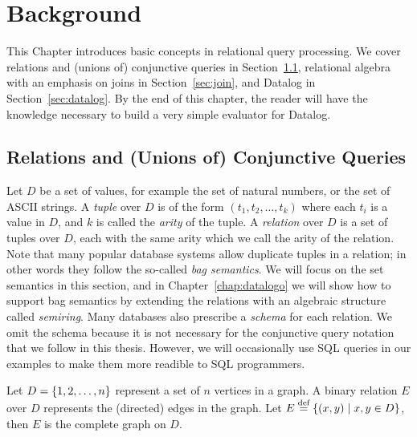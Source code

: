 \chapter{Background}
\label{chap:background}

This Chapter introduces basic concepts in relational query processing. 
We cover relations and (unions of) conjunctive queries in Section~\ref{sec:relations-and-conjunctive-queries},
 relational algebra with an emphasis on joins in Section~\ref{sec:join},
 and Datalog in Section~\ref{sec:datalog}.
By the end of this chapter, 
 the reader will have the knowledge necessary
 to build a very simple evaluator for Datalog.

\section{Relations and (Unions of) Conjunctive Queries}
\label{sec:relations-and-conjunctive-queries}

Let $D$ be a set of values, for example the set of natural numbers,
 or the set of ASCII strings.
A {\em tuple} over $D$ is of the form $(t_1, t_2, \ldots, t_k)$
 where each $t_i$ is a value in $D$,
 and $k$ is called the {\em arity} of the tuple.
A {\em relation} over $D$ is a set of tuples over $D$,
 each with the same arity which we call the arity of the relation.
Note that many popular database systems allow duplicate tuples in a relation;
 in other words they follow the so-called {\em bag semantics}.
We will focus on the set semantics in this section,
 and in Chapter~\ref{chap:datalogo} we will show how to
 support bag semantics by extending the relations
 with an algebraic structure called {\em semiring}.
Many databases also prescribe a {\em schema} for each relation.
We omit the schema because it is not necessary for the 
 conjunctive query notation that we follow in this thesis.
However, we will occasionally use SQL queries in our examples 
 to make them more readible to SQL programmers.

\begin{ex}
\label{ex:relation}
Let $D = \{1, 2, \ldots, n\}$ represent a set of $n$ vertices in a graph.
A binary relation $E$ over $D$ represents the (directed) edges in the graph.
Let $E \stackrel{\text{def}}{=} \{{(x, y)}\mid{x, y \in D}\}$, then $E$ is the complete graph on $D$.
\end{ex}

